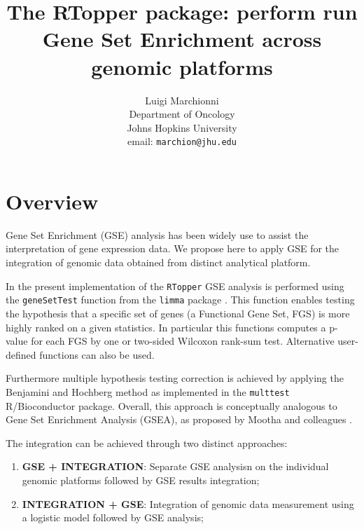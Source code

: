 \documentclass[11pt]{article}
\newcommand{\Rfunction}[1]{{\texttt{#1}}}
\newcommand{\Rpackage}[1]{{\texttt{#1}}}
\begin{document}
\title{The RTopper package: perform run Gene Set Enrichment across genomic platforms}

\author{Luigi Marchionni \\
Department of Oncology \\
Johns Hopkins University \\
email: \texttt{marchion@jhu.edu}}

\singlespacing
\maketitle
\tableofcontents


\section{Overview}
Gene Set Enrichment (GSE) analysis has been widely use to assist the  interpretation
of gene expression data. We propose here to apply GSE for the integration of genomic 
data obtained from distinct analytical platform.

In the present implementation of the \Rpackage{RTopper} GSE analysis is performed
using the \Rfunction{geneSetTest} function from the \Rpackage{limma} package
\cite{Smyth2005a,Smyth2004,Smyth2005}.
This function enables testing the hypothesis that a specific set of genes
(a Functional Gene Set, FGS) is more highly ranked on a given statistics.
In particular this functions computes a p-value for each FGS by one 
or two-sided Wilcoxon rank-sum test. Alternative user-defined functions
can also be used.

Furthermore multiple hypothesis testing correction is achieved by
applying the Benjamini and Hochberg method \cite{Benjamini1995}
as implemented in the \Rpackage{multtest} R/Bioconductor package.
Overall, this approach is conceptually analogous to Gene Set Enrichment Analysis (GSEA),
as proposed by Mootha and colleagues \cite{Mootha2003a,Subramanian2005}.

The integration can be achieved through two distinct approaches:
\begin{enumerate}
\item {\bf GSE + INTEGRATION}: Separate GSE analysisn on the 
  individual genomic platforms followed by GSE results integration;
\item {\bf INTEGRATION + GSE}: Integration of genomic data measurement 
  using a logistic model followed by GSE analysis;
\end{enumerate}
\end{document}
